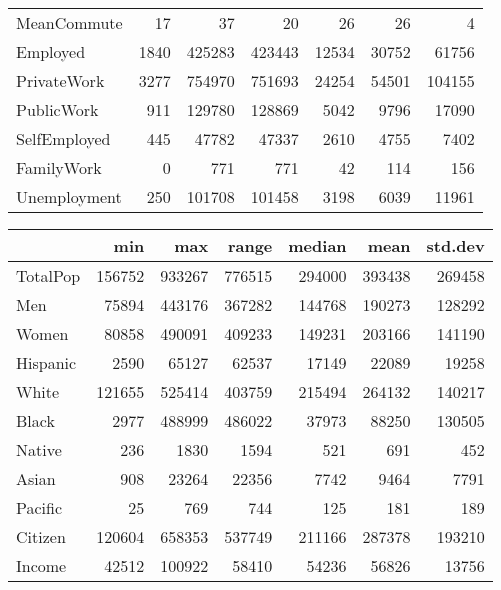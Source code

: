 \documentclass{article}
\begin{document}
\begin{table}
\begin{tabular}{l|rrrrrr}
	MeanCommute & 17 & 37 & 20 & 26 & 26 & 4\\
	Employed & 1840 & 425283 & 423443 & 12534 & 30752 & 61756\\
	PrivateWork & 3277 & 754970 & 751693 & 24254 & 54501 & 104155\\
	PublicWork & 911 & 129780 & 128869 & 5042 & 9796 & 17090\\
	SelfEmployed & 445 & 47782 & 47337 & 2610 & 4755 & 7402\\
	FamilyWork & 0 & 771 & 771 & 42 & 114 & 156\\
	Unemployment & 250 & 101708 & 101458 & 3198 & 6039 & 11961\\
	\end{tabular}
\end{table}

\begin{table}
	\centering
	\begin{tabular}{l|rrrrrr}

		& min & max & range & median & mean & std.dev\\\hline

		TotalPop & 156752 & 933267 & 776515 & 294000 & 393438 & 269458\\

		Men & 75894 & 443176 & 367282 & 144768 & 190273 & 128292\\

		Women & 80858 & 490091 & 409233 & 149231 & 203166 & 141190\\

		Hispanic & 2590 & 65127 & 62537 & 17149 & 22089 & 19258\\

		White & 121655 & 525414 & 403759 & 215494 & 264132 & 140217\\

		Black & 2977 & 488999 & 486022 & 37973 & 88250 & 130505\\

		Native & 236 & 1830 & 1594 & 521 & 691 & 452\\

		Asian & 908 & 23264 & 22356 & 7742 & 9464 & 7791\\

		Pacific & 25 & 769 & 744 & 125 & 181 & 189\\

		Citizen & 120604 & 658353 & 537749 & 211166 & 287378 & 193210\\

		Income & 42512 & 100922 & 58410 & 54236 & 56826 & 13756\\


\end{tabular}
\end{table}
\end{document}
